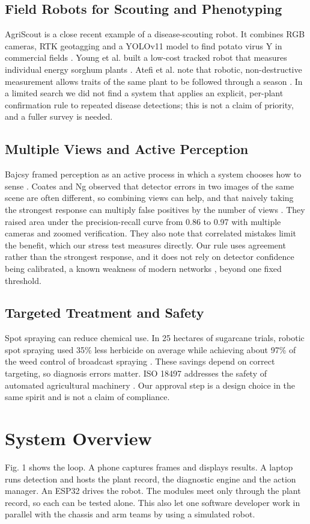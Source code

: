 \documentclass[conference]{IEEEtran}
\begin{document}
\subsection{Field Robots for Scouting and Phenotyping}
AgriScout is a close recent example of a disease-scouting robot. It combines RGB cameras, RTK geotagging and a YOLOv11 model to find potato virus Y in commercial fields \cite{agriscout}. Young et al. built a low-cost tracked robot that measures individual energy sorghum plants \cite{young}. Atefi et al. note that robotic, non-destructive measurement allows traits of the same plant to be followed through a season \cite{atefi}. In a limited search we did not find a system that applies an explicit, per-plant confirmation rule to repeated disease detections; this is not a claim of priority, and a fuller survey is needed.

\subsection{Multiple Views and Active Perception}
Bajcsy framed perception as an active process in which a system chooses how to sense \cite{bajcsy}. Coates and Ng observed that detector errors in two images of the same scene are often different, so combining views can help, and that naively taking the strongest response can multiply false positives by the number of views \cite{coates}. They raised area under the precision-recall curve from 0.86 to 0.97 with multiple cameras and zoomed verification. They also note that correlated mistakes limit the benefit, which our stress test measures directly. Our rule uses agreement rather than the strongest response, and it does not rely on detector confidence being calibrated, a known weakness of modern networks \cite{guo}, beyond one fixed threshold.

\subsection{Targeted Treatment and Safety}
Spot spraying can reduce chemical use. In 25 hectares of sugarcane trials, robotic spot spraying used 35\% less herbicide on average while achieving about 97\% of the weed control of broadcast spraying \cite{azghadi}. These savings depend on correct targeting, so diagnosis errors matter. ISO 18497 addresses the safety of automated agricultural machinery \cite{iso}. Our approval step is a design choice in the same spirit and is not a claim of compliance.

\section{System Overview}
Fig. 1 shows the loop. A phone captures frames and displays results. A laptop runs detection and hosts the plant record, the diagnostic engine and the action manager. An ESP32 drives the robot. The modules meet only through the plant record, so each can be tested alone. This also let one software developer work in parallel with the chassis and arm teams by using a simulated robot.
\end{document}
